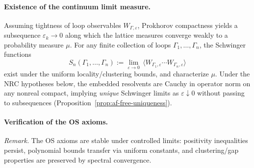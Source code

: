 \documentclass[11pt]{amsart}
\theoremstyle{plain}
\theoremstyle{definition}
\theoremstyle{remark}
\begin{document}
\paragraph{Existence of the continuum limit measure.}
Assuming tightness of loop observables $W_{\Gamma,\varepsilon}$, Prokhorov compactness yields a subsequence $\varepsilon_k\to 0$ along which the lattice measures converge weakly to a probability measure $\mu$. For any finite collection of loops $\Gamma_1,\dots,\Gamma_n$, the Schwinger functions
\[
  S_n(\Gamma_1,\dots,\Gamma_n):=\lim_{\varepsilon\to 0}\,\langle W_{\Gamma_1,\varepsilon}\cdots W_{\Gamma_n,\varepsilon}\rangle
\]
exist under the uniform locality/clustering bounds, and characterize $\mu$.
Under the NRC hypotheses below, the embedded resolvents are Cauchy in operator norm on any nonreal compact, implying \emph{unique} Schwinger limits as $\varepsilon\downarrow 0$ without passing to subsequences (Proposition~\ref{prop:af-free-uniqueness}).
\paragraph{Verification of the OS axioms.}
\emph{Remark.} The OS axioms are stable under controlled limits: positivity inequalities persist, polynomial bounds transfer via uniform constants, and clustering/gap properties are preserved by spectral convergence.
\end{document}
